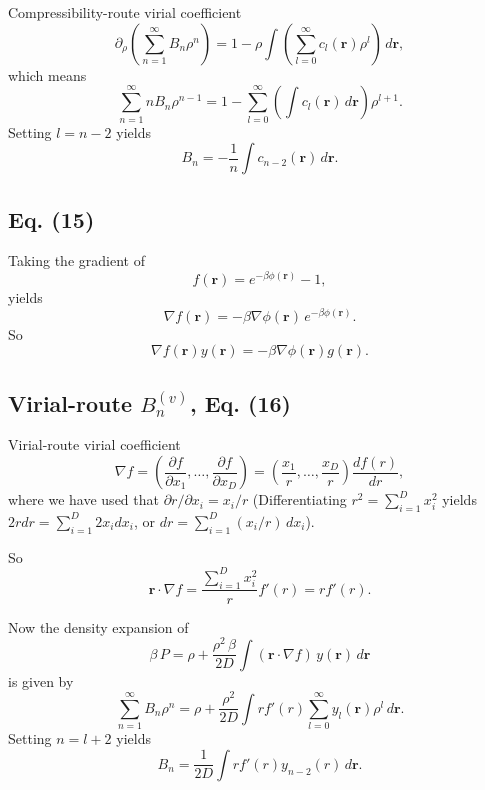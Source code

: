 \documentclass[preprint]{revtex4-1}
\numberwithin{equation}{subsection}
\numberwithin{table}{section}
\newcommand{\vct}[1]{\mathbf{#1}}
\providecommand{\vr}{} %
\renewcommand{\vr}{\vct{r}}
\begin{document}
Compressibility-route virial coefficient
\[
  \partial_\rho \left( \sum_{n = 1}^\infty B_n \rho^n \right)
=
  1 - \rho \int \left( \sum_{l = 0}^\infty c_l(\vr) \rho^l \right) \, d\vr,
\]
%
which means
%
\[
  \sum_{n = 1}^\infty n B_n \rho^{n - 1}
=
1 - \sum_{l = 0}^\infty \left( \int c_l(\vr) \, d\vr \right) \rho^{l+1}.
\]
Setting $l = n - 2$ yields
\begin{equation}
  B_n = -\frac{1}{n} \int c_{n-2}(\vr) \, d\vr.
  \tag{14}
  \label{eq:Bncompr}
\end{equation}



\subsection{Eq. (15)}

Taking the gradient of
\[
  f(\vr) = e^{-\beta \phi(\vr)} - 1,
\]
yields
\[
  \nabla f(\vr) = -\beta \nabla \phi(\vr) \, e^{-\beta \phi(\vr)}.
\]
So
\[
  \nabla f(\vr) y(\vr) = -\beta \nabla \phi(\vr) g(\vr).
\]



\subsection{Virial-route $B_n^{(v)}$, Eq. (16)}



Virial-route virial coefficient
\[
  \nabla f =
  \left(
  \frac{ \partial f }
       { \partial x_1 },
  \dots,
  \frac{ \partial f }
       { \partial x_D }
  \right)
  =
  \left(
  \frac{ x_1 } { r },
  \dots,
  \frac{ x_D } { r }
  \right)
  \frac{ d f(r) }
       { d r },
\]
where we have used that $\partial r / \partial x_i = x_i / r$
(Differentiating $r^2 = \sum_{i = 1}^D x_i^2$
 yields $2 r dr = \sum_{i = 1}^D 2 x_i d x_i$,
 or $dr = \sum_{i = 1}^D (x_i/r) \, d x_i$).

So
\[
  \vr \cdot \nabla f
=
  \frac{
    \sum_{i = 1}^D x_i^2
  } { r }
  f'(r) = r f'(r).
\]

Now the density expansion of
\begin{equation}
  \beta \, P
= \rho
  + \frac{\rho^2 \, \beta } {2 D}
  \int (\vr \cdot \nabla f) \, y(\vr) \, d\vr
  \tag{15}
\end{equation}
is given by
\[
  \sum_{n = 1}^\infty B_n \rho^n
= \rho
+
\frac{ \rho^2 }{ 2 D }
\int r f'(r)
    \sum_{l = 0}^\infty y_l(\vr) \rho^l \, d\vr.
\]
%
Setting $n = l + 2$ yields
\begin{equation}
B_n = \frac{1}{2D} \int r f'(r) y_{n-2}(r) \, d\vr.
\tag{16}
\end{equation}
\end{document}

